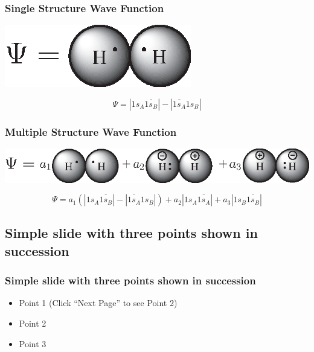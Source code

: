 \documentclass[]{beamer}
\begin{document}
\begin{frame}
  \frametitle{Single Structure Wave Function}
  \begin{center}
    \includegraphics{figures/heitler.eps}  
  \end{center}
  \begin{equation*}
    \Psi = |1s_{A}\overline{1s_{B}}| - |\overline{1s_{A}}1s_{B}|
  \end{equation*}
\end{frame}

\begin{frame}
  \frametitle{Multiple Structure Wave Function}
  \begin{center}
    \includegraphics{figures/heitlerplus.eps}
  \end{center}
  \begin{equation*}
    \Psi=a_1(|1s_{A}\overline{1s_{B}}| - |\overline{1s_{A}}1s_{B}|) + a_2 |1s_{A}\overline{1s_{A}}| + a_3 |1s_{B}\overline{1s_{B}}|
  \end{equation*}
\end{frame}

\subsection{Simple slide with three points shown in succession}

\begin{frame}
  \frametitle{Simple slide with three points shown in succession}   %

  \begin{itemize}
  \item<1-> Point 1 (Click ``Next Page'' to see Point 2) %
  \item<2-> Point 2  %
  \item<3-> Point 3
  \end{itemize}
\end{frame}
\end{document}
